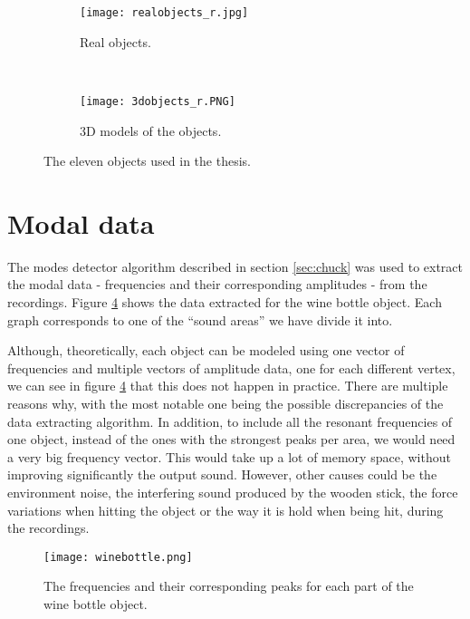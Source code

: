 \begin{figure}[H]
    \centering
    \begin{subfigure}[b]{0.8\textwidth}
        \texttt{[image: realobjects\_r.jpg]}
        \caption{Real objects.}
        \label{fig:real}
    \end{subfigure}
    ~ %
    \begin{subfigure}[b]{0.8\textwidth}
        \texttt{[image: 3dobjects\_r.PNG]}
        \caption{3D models of the objects.}
        \label{fig:models}
    \end{subfigure}
    \caption{The eleven objects used in the thesis.}\label{fig:objects}
\end{figure}

\section{Modal data}
The modes detector algorithm described in section \ref{sec:chuck} was used to extract the modal data - frequencies and their corresponding amplitudes - from the recordings. Figure \ref{fig:bottle_data} shows the data extracted for the wine bottle object. Each graph corresponds to one of the ``sound areas'' we have divide it into.

Although, theoretically, each object can be modeled using one vector of frequencies and multiple vectors of amplitude data, one for each different vertex, we can see in figure \ref{fig:bottle_data} that this does not happen in practice. There are multiple reasons why, with the most notable one being the possible discrepancies of the data extracting algorithm. In addition, to include all the resonant frequencies of one object, instead of the ones with the strongest peaks per area, we would need a very big frequency vector. This would take up a lot of memory space, without improving significantly the output sound. However, other causes could be the environment noise, the interfering sound produced by the wooden stick, the force variations when hitting the object or the way it is hold when being hit, during the recordings.

\begin{figure}[H]
  \centering
    \texttt{[image: winebottle.png]}
      \caption{The frequencies and their corresponding peaks for each part of the wine bottle object.}\label{fig:bottle_data}
\end{figure}

